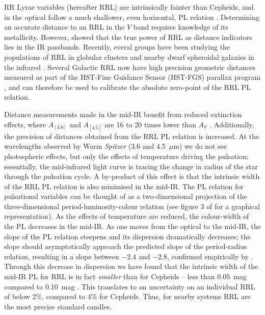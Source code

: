 \documentclass[a4paper,fleqn,usenatbib]{mnras}
\begin{document}
RR Lyrae variables (hereafter RRL) are intrinsically fainter than Cepheids, and in the optical follow a much shallower, even horizontal, PL relation \citep{2004ApJS..154..633C}. Determining an accurate distance to an RRL in the $V$ band requires knowledge of its metallicity. However, \citet{1986MNRAS.220..279L} showed that the true power of RRL as distance indicators lies in the IR passbands. Recently, everal groups have been studying the populations of RRL in globular clusters and nearby dwarf spheroidal galaxies in the infrared \citep[e.g.][and references therein]{2013ApJ...767...62G, 2014ApJ...786..147O, 2015ApJ...806..200C, 2015A&A...578A.128K}. Several Galactic RRL now have high precision geometric distances measured as part of the HST-Fine Guidance Sensor (HST-FGS) parallax program \citep{2011AJ....142..187B}, and can therefore be used to calibrate the absolute zero-point of the RRL PL relation.%

Distance measurements made in the mid-IR benefit from reduced extinction effects, where $A_{[3.6]}$ and $A_{[4.5]}$ are 16 to 20 times lower than $A_V$ \citep{1989ApJ...345..245C, 2005ApJ...619..931I}. Additionally, the precision of distances obtained from the RRL PL relation is increased. At the wavelengths observed by Warm \textit{Spitzer} (3.6 and 4.5~$\mu$m) we do not see photospheric effects, but only the effects of temperature driving the pulsation; essentially, the mid-infrared light curve is tracing the change in radius of the star through the pulsation cycle. A by-product of this effect is that the intrinsic width of the RRL PL relation is also minimised in the mid-IR. The PL relation for pulsational variables can be thought of as a two-dimensional projection of the three-dimensional period-luminosity-colour relation (see figure 3 of \citet{1991PASP..103..933M} for a graphical representation). As the effects of temperature are reduced, the colour-width of the PL decreases in the mid-IR. As one moves from the optical to the mid-IR, the slope of the PL relation steepens and its dispersion dramatically decreases; the slope should asymptotically approach the predicted slope of the period-radius relation, resulting in a slope between $-2.4$ and $-2.8$, confirmed empirically by \citet{2013ApJ...776..135M}. Through this decrease in dispersion we have found that the intrinsic width of the mid-IR PL for RRL is in fact \emph{smaller} than for Cepheids -- less than 0.05~mag compared to 0.10~mag \citep{2015ApJ...808...11N}. This translates to an uncertainty on an individual RRL of below 2\%, compared to 4\% for Cepheids. Thus, for nearby systems RRL are the most precise standard candles.
\end{document}
